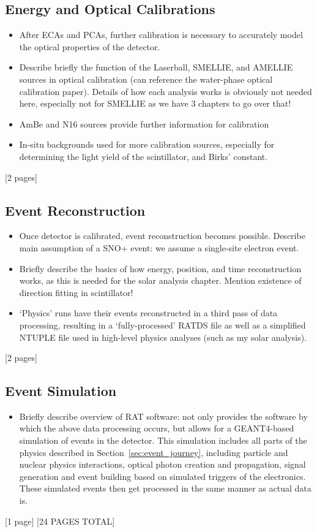 {    \subsection{Energy and Optical Calibrations}
    \begin{itemize}
        \item After ECAs and PCAs, further calibration is necessary to accurately model the optical properties of the detector.
        \item Describe briefly the function of the Laserball, SMELLIE, and AMELLIE sources in optical calibration (can reference the water-phase optical calibration paper). Details of how each analysis works is obviously not needed here, especially not for SMELLIE as we have 3 chapters to go over that!
        \item AmBe and N16 sources provide further information for calibration
        \item In-situ backgrounds used for more calibration sources, especially for determining the light yield of the scintillator, and Birks' constant.
    \end{itemize}
    [2 pages]
    \subsection{Event Reconstruction}
    \begin{itemize}
        \item Once detector is calibrated, event reconstruction becomes possible. Describe main assumption of a SNO+ event: we assume a single-site electron event.
        \item Briefly describe the basics of how energy, position, and time reconstruction works, as this is needed for the solar analysis chapter. Mention existence of direction fitting in scintillator!
        \item `Physics' runs have their events reconstructed in a third pass of data processing, resulting in a `fully-processed' RATDS file as well as a simplified NTUPLE file used in high-level physics analyses (such as my solar analysis).
    \end{itemize}
    [2 pages]
    \subsection{Event Simulation}
    \begin{itemize}
        \item Briefly describe overview of RAT software: not only provides the software by which the above data processing occurs, but allows for a GEANT4-based simulation of events in the detector. This simulation includes all parts of the physics described in Section~\ref{sec:event_journey}, including particle and nuclear physics interactions, optical photon creation and propagation, signal generation and event building based on simulated triggers of the electronics. These simulated events then get processed in the same manner as actual data is.
    \end{itemize}
    [1 page]
    [24 PAGES TOTAL]
}